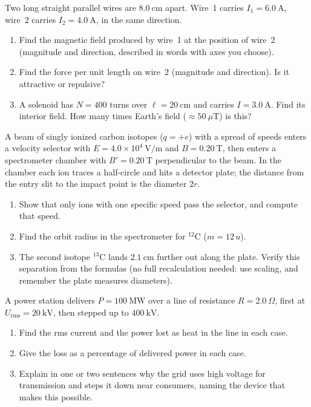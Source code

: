 
\begin{exercise}\label{ex:em-9}
Two long straight parallel wires are $8.0\ \mathrm{cm}$ apart. Wire~1 carries $I_1 = 6.0\ \mathrm{A}$, wire~2 carries $I_2 = 4.0\ \mathrm{A}$, in the same direction.
\begin{enumerate}[label=(\alph*)]
  \item Find the magnetic field produced by wire~1 at the position of wire~2 (magnitude and direction, described in words with axes you choose).
  \item Find the force per unit length on wire~2 (magnitude and direction). Is it attractive or repulsive?
  \item A solenoid has $N = 400$ turns over $\ell = 20\ \mathrm{cm}$ and carries $I = 3.0\ \mathrm{A}$. Find its interior field. How many times Earth's field ($\approx 50\ \mu\mathrm{T}$) is this?
\end{enumerate}
\end{exercise}

\begin{exercise}\label{ex:em-10}
A beam of singly ionized carbon isotopes ($q = +e$) with a spread of speeds enters a velocity selector with $E = 4.0\times 10^{4}\ \mathrm{V/m}$ and $B = 0.20\ \mathrm{T}$, then enters a spectrometer chamber with $B' = 0.20\ \mathrm{T}$ perpendicular to the beam. In the chamber each ion traces a half-circle and hits a detector plate; the distance from the entry slit to the impact point is the diameter $2r$.
\begin{enumerate}[label=(\alph*)]
  \item Show that only ions with one specific speed pass the selector, and compute that speed.
  \item Find the orbit radius in the spectrometer for $^{12}\mathrm{C}$ ($m = 12\,u$).
  \item The second isotope $^{13}\mathrm{C}$ lands $2.1\ \mathrm{cm}$ further out along the plate. Verify this separation from the formulas (no full recalculation needed: use scaling, and remember the plate measures diameters).
\end{enumerate}
\end{exercise}

\begin{exercise}\label{ex:em-11}
A power station delivers $P = 100\ \mathrm{MW}$ over a line of resistance $R = 2.0\ \Omega$, first at $U_\text{rms} = 20\ \mathrm{kV}$, then stepped up to $400\ \mathrm{kV}$.
\begin{enumerate}[label=(\alph*)]
  \item Find the rms current and the power lost as heat in the line in each case.
  \item Give the loss as a percentage of delivered power in each case.
  \item Explain in one or two sentences why the grid uses high voltage for transmission and steps it down near consumers, naming the device that makes this possible.
\end{enumerate}
\end{exercise}


